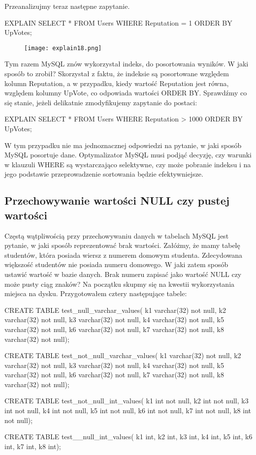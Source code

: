 Przeanalizujmy teraz następne zapytanie.

\begin{spverbatim}
	EXPLAIN SELECT * FROM Users WHERE Reputation = 1 ORDER BY UpVotes;
\end{spverbatim}
\begin{figure}[H]
	\texttt{[image: explain18.png]} 
\end{figure}
Tym razem MySQL znów wykorzystał indeks, do posortowania wyników. W jaki sposób to zrobił? 
Skorzystał z faktu, że indeksie są posortowane względem kolumn Reputation, a w przypadku, kiedy wartość Reputation jest równa, względem kolumny UpVote, co odpowiada wartości ORDER BY.
Sprawdźmy co się stanie, jeżeli delikatnie zmodyfikujemy zapytanie do postaci:
\begin{spverbatim}
	EXPLAIN SELECT * FROM Users WHERE Reputation > 1000 ORDER BY UpVotes;
\end{spverbatim}

W tym przypadku nie ma jednoznacznej odpowiedzi na pytanie, w jaki sposób MySQL posortuje dane. Optymalizator MySQL musi podjąć decyzję, czy warunki w klauzuli WHERE są wystarczająco selektywne, czy może pobranie indeksu i na jego podstawie przeprowadzenie sortowania będzie efektywniejsze.

\subsection{Przechowywanie wartości NULL czy pustej wartości}
Częstą wątpliwością przy przechowywaniu danych w tabelach MySQL jest pytanie, w jaki sposób reprezentować brak wartości. Załóżmy, że mamy tabelę studentów, która posiada wiersz z numerem domowym studenta. Zdecydowana większość studentów nie posiada numeru domowego. W jaki zatem sposób ustawić wartość w bazie danych. Brak numeru zapisać jako wartość NULL czy może pusty ciąg znaków? Na początku skupmy się na kwestii wykorzystania miejsca na dysku. Przygotowałem cztery następujące tabele:

\begin{spverbatim}
	CREATE TABLE test_null_varchar_values(
	k1 varchar(32) not null, k2 varchar(32) not null,
	k3 varchar(32) not null, k4 varchar(32) not null,
	k5 varchar(32) not null, k6 varchar(32) not null,
	k7 varchar(32) not null, k8 varchar(32) not null);
	
	CREATE TABLE test_not_null_varchar_values(
	k1 varchar(32) not null, k2 varchar(32) not null,
	k3 varchar(32) not null, k4 varchar(32) not null,
	k5 varchar(32) not null, k6 varchar(32) not null,
	k7 varchar(32) not null, k8 varchar(32) not null);
	
	CREATE TABLE test_not_null_int_values(
	k1 int not null, k2 int not null,
	k3 int not null, k4 int not null,
	k5 int not null, k6 int not null,
	k7 int not null, k8 int not null);
	
	CREATE TABLE test__null_int_values(
	k1 int,	k2 int,	k3 int, k4 int,
	k5 int,	k6 int,	k7 int,	k8 int);
	
\end{spverbatim}

